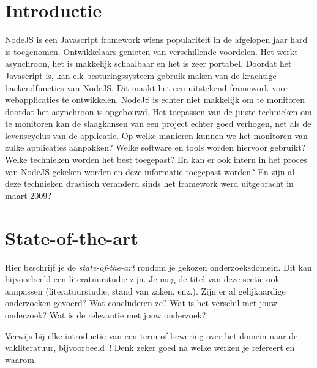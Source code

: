 
\section{Introductie} %
\label{sec:introductie}

NodeJS is een Javascript framework wiens populariteit in de afgelopen jaar hard is toegenomen. Ontwikkelaars genieten van verschillende voordelen. Het werkt asynchroon, het is makkelijk schaalbaar en het is zeer portabel. Doordat het Javascript is, kan elk besturingssysteem gebruik maken van de krachtige backendfuncties van NodeJS. Dit maakt het een uitstekend framework voor webapplicaties te ontwikkelen.  NodeJS is echter niet makkelijk om te monitoren doordat het asynchroon is opgebouwd. Het toepassen van de juiste technieken om te monitoren kan de slaagkansen van een project echter goed verhogen, net als de levenscyclus van de applicatie. Op welke manieren kunnen we het monitoren van zulke applicaties aanpakken? Welke software en tools worden hiervoor gebruikt? Welke technieken worden het best toegepast? En kan er ook intern in het proces van NodeJS gekeken worden en deze informatie toegepast worden? En zijn al deze technieken drastisch veranderd sinds het framework werd uitgebracht in maart 2009? 


\section{State-of-the-art}
\label{sec:state-of-the-art}



Hier beschrijf je de \emph{state-of-the-art} rondom je gekozen onderzoeksdomein. Dit kan bijvoorbeeld een literatuurstudie zijn. Je mag de titel van deze sectie ook aanpassen (literatuurstudie, stand van zaken, enz.). Zijn er al gelijkaardige onderzoeken gevoerd? Wat concluderen ze? Wat is het verschil met jouw onderzoek? Wat is de relevantie met jouw onderzoek?

Verwijs bij elke introductie van een term of bewering over het domein naar de vakliteratuur, bijvoorbeeld~\autocite{Doll1954}! Denk zeker goed na welke werken je refereert en waarom.

